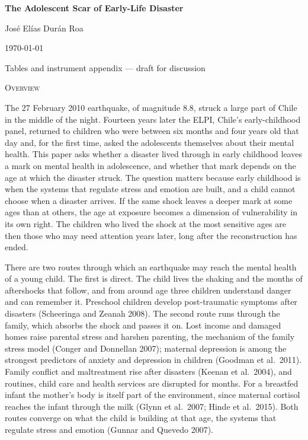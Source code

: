 \documentclass[12pt]{article}
\begin{document}
\begin{titlepage}
\centering
\vspace*{2cm}
{\Large\bfseries The Adolescent Scar of Early-Life Disaster\par}
\vspace{1.5cm}
{\large José Elías Durán Roa\par}
\vspace{1cm}
{\large \today\par}
\vspace{1cm}
{\normalsize Tables and instrument appendix --- draft for discussion\par}
\end{titlepage}

\setcounter{page}{1}

\begin{center}
{\scshape Overview}
\end{center}

The 27 February 2010 earthquake, of magnitude 8.8, struck a large part of
Chile in the middle of the night. Fourteen years later the ELPI, Chile's
early-childhood panel, returned to children who were between six months
and four years old that day and, for the first time, asked the adolescents
themselves about their mental health. This paper asks whether a disaster
lived through in early childhood leaves a mark on mental health in
adolescence, and whether that mark depends on the age at which the disaster
struck. The question matters because early childhood is when the systems
that regulate stress and emotion are built, and a child cannot choose when
a disaster arrives. If the same shock leaves a deeper mark at some ages than
at others, the age at exposure becomes a dimension of vulnerability in its
own right. The children who lived the shock at the most sensitive ages are
then those who may need attention years later, long after the
reconstruction has ended.

There are two routes through which an earthquake may reach the mental
health of a young child. The first is direct. The child lives the shaking
and the months of aftershocks that follow, and from around age three
children understand danger and can remember it. Preschool children develop
post-traumatic symptoms after disasters (Scheeringa and Zeanah 2008). The
second route runs through the family, which absorbs the shock and passes it
on. Lost income and damaged homes raise parental stress and harshen
parenting, the mechanism of the family stress model (Conger and Donnellan
2007); maternal depression is among the strongest predictors of anxiety and
depression in children (Goodman et al.\ 2011). Family conflict and
maltreatment rise after disasters (Keenan et al.\ 2004), and routines, child
care and health services are disrupted for months. For a breastfed infant
the mother's body is itself part of the environment, since maternal
cortisol reaches the infant through the milk (Glynn et al.\ 2007; Hinde et
al.\ 2015). Both routes converge on what the child is building at that age,
the systems that regulate stress and emotion (Gunnar and Quevedo 2007).
\end{document}

